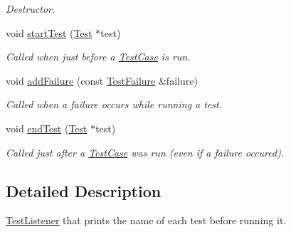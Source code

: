 \begin{DoxyCompactItemize}
\begin{DoxyCompactList}\small\item\em Destructor. \end{DoxyCompactList}\item 
\hypertarget{class_brief_test_progress_listener_ab4196e15752bb2be443e72418500e20e}{void \hyperlink{class_brief_test_progress_listener_ab4196e15752bb2be443e72418500e20e}{start\+Test} (\hyperlink{class_test}{Test} $\ast$test)}\label{class_brief_test_progress_listener_ab4196e15752bb2be443e72418500e20e}

\begin{DoxyCompactList}\small\item\em Called when just before a \hyperlink{class_test_case}{Test\+Case} is run. \end{DoxyCompactList}\item 
void \hyperlink{class_brief_test_progress_listener_a21f8658a9c19c67220241656cfad30ce}{add\+Failure} (const \hyperlink{class_test_failure}{Test\+Failure} \&failure)
\begin{DoxyCompactList}\small\item\em Called when a failure occurs while running a test. \end{DoxyCompactList}\item 
\hypertarget{class_brief_test_progress_listener_a49cbd9152ea35a21f6525773660ee119}{void \hyperlink{class_brief_test_progress_listener_a49cbd9152ea35a21f6525773660ee119}{end\+Test} (\hyperlink{class_test}{Test} $\ast$test)}\label{class_brief_test_progress_listener_a49cbd9152ea35a21f6525773660ee119}

\begin{DoxyCompactList}\small\item\em Called just after a \hyperlink{class_test_case}{Test\+Case} was run (even if a failure occured). \end{DoxyCompactList}\end{DoxyCompactItemize}


\subsection{Detailed Description}
\hyperlink{class_test_listener}{Test\+Listener} that prints the name of each test before running it. 

